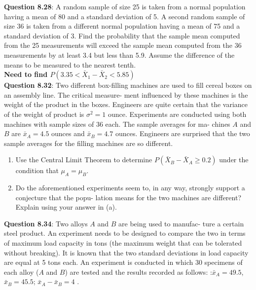 \documentclass{article}
\begin{document}
    \textbf{Question 8.28}: A random sample of size 25 is taken from a 
    normal population having a mean of 80 and a standard
    deviation of 5. A second random sample of size 36
    is taken from a different normal population having a
    mean of 75 and a standard deviation of 3. Find the
    probability that the sample mean computed from the
    25 measurements will exceed the sample mean computed 
    from the 36 measurements by at least 3.4 but
    less than 5.9. Assume the difference of the means to
    be measured to the nearest tenth.\\\newline
    \textbf{Need to find $P(3.35 < \bar{X}_1 - \bar{X}_2 < 5.85)$}\\\newline
    \textbf{Question 8.32}: Two different box-filling machines are used to fill
    cereal boxes on an assembly line. The critical measure-
    ment influenced by these machines is the weight of the
    product in the boxes. Engineers are quite certain that
    the variance of the weight of product is $\sigma^2 = 1$ ounce.
    Experiments are conducted using both machines with
    sample sizes of 36 each. The sample averages for ma-
    chines $A$ and $B$ are $\bar{x}_A = 4.5$ ounces and $\bar{x}_B = 4.7$
    ounces. Engineers are surprised that the two sample
    averages for the filling machines are so different.
        \begin{enumerate}[label = (\alph*) ]
            \item Use the Central Limit Theorem to determine $P(\bar{X}_B - \bar{X}_A \geq 0.2)$
            under the condition that $\mu_A = \mu_B$.
            \item Do the aforementioned experiments seem to, in any
            way, strongly support a conjecture that the popu-
            lation means for the two machines are different?
            Explain using your answer in (a).
        \end{enumerate}
    \textbf{Question 8.34}: Two alloys $A$ and $B$ are being used to manufac-
    ture a certain steel product. An experiment needs to
    be designed to compare the two in terms of maximum
    load capacity in tons (the maximum weight that can
    be tolerated without breaking). It is known that the
    two standard deviations in load capacity are equal at
    5 tons each. An experiment is conducted in which 30
    specimens of each alloy ($A$ and $B$) are tested and the
    results recorded as follows:\newline
    :\hfill $\bar{x}_A = 49.5$, \hfill $\bar{x}_B=45.5$; \hfill $\bar{x}_A-\bar{x}_B = 4$ \hfill.\newline
\end{document}
